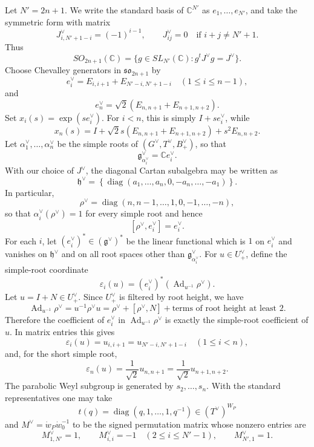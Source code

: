 \documentclass{article}
\newcommand{\CC}{\mathbb{C}}
\begin{document}
Let \(N'=2n+1\). We write the standard basis of \(\CC^{N'}\) as \(e_1,\ldots,e_{N'}\), and take the symmetric form with matrix
\[
J^\vee_{i,N'+1-i}=(-1)^{i-1},
\qquad
J^\vee_{ij}=0\quad\text{if }i+j\ne N'+1.
\]
Thus
\[
SO_{2n+1}(\CC)=\{g\in SL_{N'}(\CC):g^tJ^\vee g=J^\vee\}.
\]
Choose Chevalley generators in \(\mathfrak{so}_{2n+1}\) by
\[
e_i^\vee=E_{i,i+1}+E_{N'-i,N'+1-i}
\quad(1\le i\le n-1),
\]
and
\[
e_n^\vee=\sqrt2(E_{n,n+1}+E_{n+1,n+2}).
\]
Set \(x_i(s)=\exp(se_i^\vee)\). For \(i<n\), this is simply \(I+se_i^\vee\), while
\[
x_n(s)=I+\sqrt2s(E_{n,n+1}+E_{n+1,n+2})+s^2E_{n,n+2}.
\]
Let \(\alpha_1^\vee,\ldots,\alpha_n^\vee\) be the simple roots of \((G^\vee,T^\vee,B_+^\vee)\), so that
\[
\mathfrak g^\vee_{\alpha_i^\vee}=\CC e_i^\vee .
\]
With our choice of \(J^\vee\), the diagonal Cartan subalgebra may be written as
\[
\mathfrak h^\vee
=
\left\{
\operatorname{diag}(a_1,\ldots,a_n,0,-a_n,\ldots,-a_1)
\right\}.
\]
In particular,
\[
\rho^\vee
=
\operatorname{diag}(n,n-1,\ldots,1,0,-1,\ldots,-n),
\]
so that \(\alpha_i^\vee(\rho^\vee)=1\) for every simple root and hence
\[
[\rho^\vee,e_i^\vee]=e_i^\vee .
\]
For each \(i\), let \((e_i^\vee)^*\in(\mathfrak g^\vee)^*\) be the linear functional which is \(1\) on \(e_i^\vee\) and vanishes on \(\mathfrak h^\vee\) and on all root spaces other than \(\mathfrak g^\vee_{\alpha_i^\vee}\). For \(u\in U_+^\vee\), define the simple-root coordinate
\[
\varepsilon_i(u)=(e_i^\vee)^*(\operatorname{Ad}_{u^{-1}}\rho^\vee).
\]
Let \(u=I+N\in U_+^\vee\). Since \(U_+^\vee\) is filtered by root height, we have
\[
\operatorname{Ad}_{u^{-1}}\rho^\vee
=
u^{-1}\rho^\vee u
=
\rho^\vee+[\rho^\vee,N]+\text{terms of root height at least }2.
\]
Therefore the coefficient of \(e_i^\vee\) in \(\operatorname{Ad}_{u^{-1}}\rho^\vee\) is exactly the simple-root coefficient of \(u\). In matrix entries this gives
\[
\varepsilon_i(u)=u_{i,i+1}=u_{N'-i,N'+1-i}\quad(1\le i<n),
\]
and, for the short simple root,
\[
\varepsilon_n(u)=\frac{1}{\sqrt2}u_{n,n+1}
=
\frac{1}{\sqrt2}u_{n+1,n+2}.
\]
The parabolic Weyl subgroup is generated by \(s_2,\ldots,s_n\). With the standard representatives one may take
\[
t(q)=\operatorname{diag}(q,1,\ldots,1,q^{-1})\in (T^\vee)^{W_P}
\]
and \(M^\vee=\dot w_P\dot w_0^{-1}\) to be the signed permutation matrix whose nonzero entries are
\[
M^\vee_{1,N'}=1,
\qquad
M^\vee_{i,i}=-1\quad(2\le i\le N'-1),
\qquad
M^\vee_{N',1}=1.
\]
\end{document}

